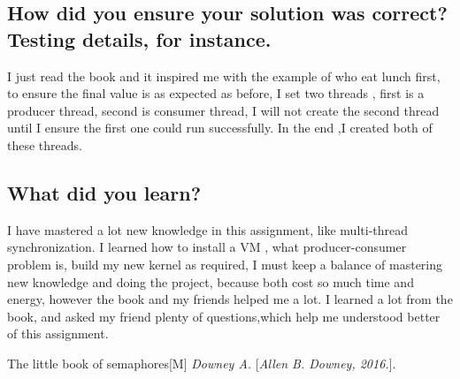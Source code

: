 \documentclass[10pt,draftclsnofoot,peerreview,letterpaper,onecolumn,]{IEEEtran}
\begin{document}
\subsection{How did you ensure your solution was correct? Testing details, for instance.}
I just read the book and it inspired me with the example of who eat lunch first, to ensure the final value is as expected as before, I set two threads , first is a producer thread, second is consumer thread, I will not create the second thread until I ensure the first one could run successfully. In the end ,I created both of these threads.

\subsection{What did you learn?}
I have mastered a lot new knowledge in this assignment, like multi-thread synchronization. I learned how to install a VM , what producer-consumer problem is, build my new kernel as required, I must keep a balance of mastering new knowledge and doing the project, because both cost so much time and energy, however the book and my friends helped me a lot. I learned a lot from the book, and asked my friend plenty of questions,which help me understood better of this assignment.

\begin{thebibliography}{1}

 The little book of semaphores[M]
\textit{Downey A.}
[\textit{Allen B. Downey, 2016.}].

\end{thebibliography}
\end{document}
